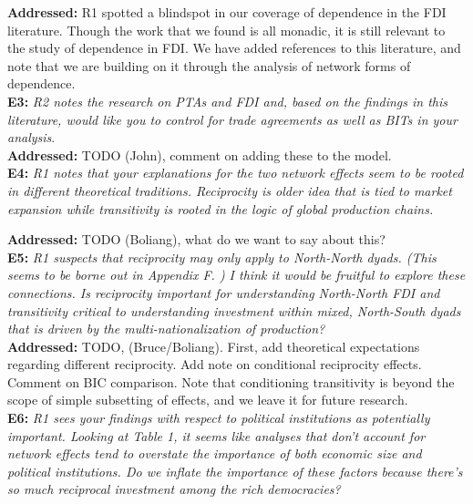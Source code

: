 \documentclass[a4paper,11pt]{texMemo}
\begin{document}
\noindent \textbf{Addressed:} R1 spotted a blindspot in our coverage of dependence in the FDI literature. Though the work that we found is all monadic, it is still relevant to the study of dependence in FDI. We have added references to this literature, and note that we are building on it through the analysis of network forms of dependence. \\

\noindent \textbf{E3:} \emph{R2 notes the research on PTAs and FDI and, based on the findings in this literature, would like you to control for trade agreements as well as BITs in your analysis}.\\

\noindent \textbf{Addressed:} TODO (John), comment on adding these to the model. \\

\noindent \textbf{E4:} \emph{R1 notes that your explanations for the two network effects seem to be rooted in different theoretical traditions. Reciprocity is older idea that is tied to market expansion while transitivity is rooted in the logic of global production chains.} 

\noindent \textbf{Addressed:}  TODO (Boliang), what  do we want to say about this?\\

\noindent \textbf{E5:} \emph{R1 suspects that reciprocity may only apply to North-North dyads. (This seems to be borne out in Appendix F. ) I think it would be fruitful to explore these connections. Is reciprocity important for understanding North-North FDI and transitivity critical to understanding investment within mixed, North-South dyads that is driven by the multi-nationalization of production?}\\

\noindent \textbf{Addressed:} TODO,  (Bruce/Boliang). First, add theoretical expectations regarding different reciprocity. Add note on conditional reciprocity effects. Comment on BIC comparison. Note that conditioning transitivity is beyond the scope of simple  subsetting of effects, and we leave it for future research. \\

\noindent \textbf{E6:} \emph{R1 sees your findings with respect to political institutions as potentially important. Looking at Table 1, it seems like analyses that don't account for network effects tend to overstate the importance of both economic size and political institutions. Do we inflate the importance of these factors because there's so much reciprocal investment among the rich democracies?}\\
\end{document}
